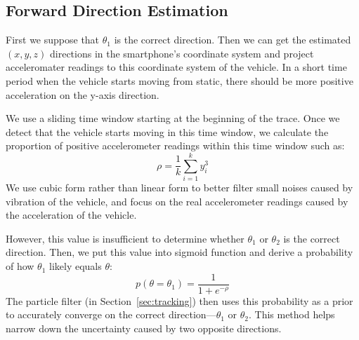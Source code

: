 \subsection{Forward Direction Estimation} \label{subsec:pose_directed}

First we suppose that $\theta_1$ is the correct direction. Then we can get the estimated $(x, y, z)$ directions in the smartphone's coordinate system and project acceleromater readings to this coordinate system of the vehicle. In a short time period when the vehicle starts moving from static, there should be more positive acceleration on the y-axis direction.

We use a sliding time window starting at the beginning of the trace. Once we detect that the vehicle starts moving in this time window, we calculate the proportion of positive accelerometer readings within this time window such as:
\begin{equation}
\rho = \frac{1}{k}\sum_{i=1}^{k}y_i^3
\end{equation}
We use cubic form rather than linear form to better filter small noises caused by vibration of the vehicle, and focus on the real accelerometer readings caused by the acceleration of the vehicle.


However, this value is insufficient to determine whether $\theta_1$ or $\theta_2$ is the correct direction. Then, we put this value into sigmoid function and derive a probability of how $\theta_1$ likely equals $\theta$:
\begin{equation}
p(\theta=\theta_1)=\frac{1}{1+e^{-\rho}}
\end{equation}
The particle filter (in Section~\ref{sec:tracking}) then uses this probability as a prior to accurately converge on the correct direction---$\theta_1$ or $\theta_2$. This method helps narrow down the uncertainty caused by two opposite directions. %





